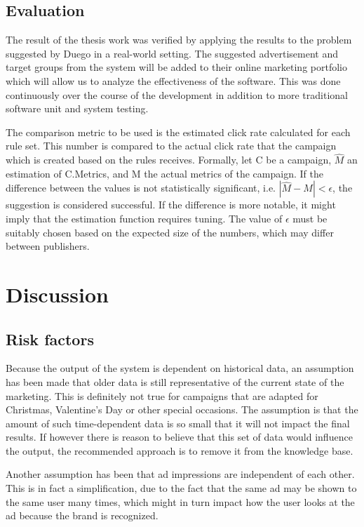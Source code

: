 \documentclass[11pt,a4paper]{report}
\begin{document}
\section{Evaluation}
The result of the thesis work was verified by applying the results to the problem suggested by Duego in a real-world setting. The suggested advertisement and target groups from the system will be added to their online marketing portfolio which will allow us to analyze the effectiveness of the software. This was done continuously over the course of the development in addition to more traditional software unit and system testing.

The comparison metric to be used is the estimated click rate calculated for each rule set. This number is compared to the actual click rate that the campaign which is created based on the rules receives. Formally, let C be a campaign, \(\hat{M}\) an estimation of C.Metrics, and M the actual metrics of the campaign. If the difference between the values is not statistically significant, i.e. \(|\hat{M} - M| < \epsilon\), the suggestion is considered successful. If the difference is more notable, it might imply that the estimation function requires tuning. The value of \(\epsilon\) must be suitably chosen based on the expected size of the numbers, which may differ between publishers.

\chapter{Discussion}
\section{Risk factors}
Because the output of the system is dependent on historical data, an assumption has been made that older data is still representative of the current state of the marketing. This is definitely not true for campaigns that are adapted for Christmas, Valentine's Day or other special occasions. The assumption is that the amount of such time-dependent data is so small that it will not impact the final results. If however there is reason to believe that this set of data would influence the output, the recommended approach is to remove it from the knowledge base.

Another assumption has been that ad impressions are independent of each other. This is in fact a simplification, due to the fact that the same ad may be shown to the same user many times, which might in turn impact how the user looks at the ad because the brand is recognized.
\end{document}

